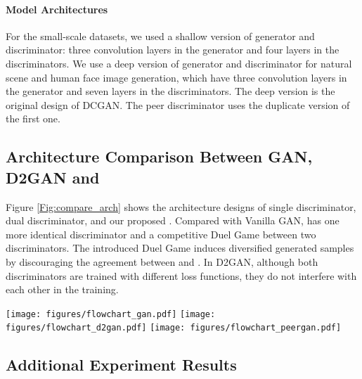 \paragraph{Model Architectures}

For the small-scale datasets, we used a shallow version of generator and discriminator: three convolution layers in the generator and four layers in the discriminators. We use a deep version of generator and discriminator for natural scene and human face image generation, which have three convolution layers in the generator and seven layers in the discriminators. The deep version is the original design of DCGAN\cite{DCGAN}. The peer discriminator uses the duplicate version of the first one. 

\subsection{Architecture Comparison Between GAN, D2GAN and \PG{}}
Figure \ref{Fig:compare_arch} shows the architecture designs of single discriminator, dual discriminator, and our proposed \PG{}. Compared with Vanilla GAN, \PG{} has one more identical discriminator and a competitive Duel Game between two discriminators. The introduced Duel Game induces diversified generated samples by discouraging the agreement between  and . In D2GAN, although both discriminators are trained with different loss functions, they do not interfere with each other in the training. 
\begin{figure*}[!htb]
\vspace{-0.07in}
    \centering
    \vspace{-0.1in}
    {\texttt{[image: figures/flowchart\_gan.pdf]}
    }
    \vspace{-0.1in}
    {\texttt{[image: figures/flowchart\_d2gan.pdf]}
    }
    {\texttt{[image: figures/flowchart\_peergan.pdf]}
    }
        \vspace{-5pt}
        \caption{Architecture comparisons between GAN based method (first row), dual discriminators GAN based method (second row) and \PG{} (third row).}
    \label{Fig:compare_arch}
\end{figure*}



\subsection{Additional Experiment Results}

